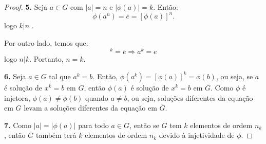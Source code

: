 \documentclass[a4paper,portuguese,11pt,twoside, leqno]{book}
\theoremstyle{definition}
\begin{document}
\begin{proof}
		\par\vspace{0.4cm}
		\textbf{5.} Seja $a\in G$ com $|a| = n$ e $|\phi(a)| = k$. Então:
		\begin{equation*}
		\phi(a^n) = \overline{e} = [\phi(a)]^n.
		\end{equation*}
		logo $k|n$
		.	\par Por outro lado, temos que:
		\begin{equation*}
		[\phi(a)]^k = \overline{e} \Rightarrow a^k = e
		\end{equation*}
		logo $n|k$. Portanto, $n = k$.
		\par\vspace{0.4cm}
		\textbf{6.} Seja $a \in G$ tal que $a^k = b$. Então, $\phi(a^k) = [\phi(a)]^k = \phi(b)$, ou seja, se $a$ é solução de $x^k = b$ em $G$, então $\phi(a)$ é solução de $x^k = b$ em $\overline{G}$. Como $\phi$ é injetora, $\phi(a)\neq\phi(b)$ quando $a\neq b$, ou seja, soluções diferentes da equação em $G$ levam a soluções diferentes da equação em $\overline{G}$. 
		\par\vspace{0.4cm}
		\textbf{7.} Como $|a| = |\phi(a)|$ para todo $a\in G$, então se $G$ tem $k$ elementos de ordem $n_k$, então $\overline{G}$ também terá $k$ elementos de ordem $n_k$ devido à injetividade de $\phi$.	
		
	\end{proof}  
	\par\vspace{0.3cm}
	
\end{document}
